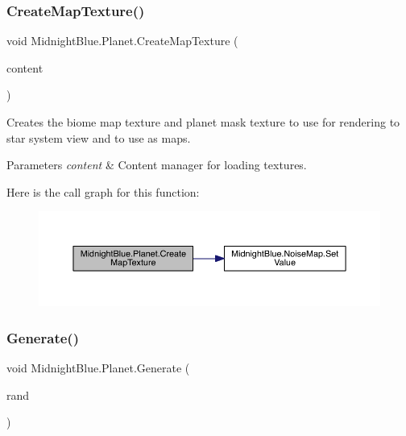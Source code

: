 \subsubsection{\texorpdfstring{Create\+Map\+Texture()}{CreateMapTexture()}}
{\footnotesize\ttfamily void Midnight\+Blue.\+Planet.\+Create\+Map\+Texture (\begin{DoxyParamCaption}\item[{Content\+Manager}]{content }\end{DoxyParamCaption})\hspace{0.3cm}{\ttfamily [inline]}}



Creates the biome map texture and planet mask texture to use for rendering to star system view and to use as maps. 


\begin{DoxyParams}{Parameters}
{\em content} & Content manager for loading textures.\\
\hline
\end{DoxyParams}
Here is the call graph for this function\+:\nopagebreak
\begin{figure}[H]
\begin{center}
\leavevmode
\includegraphics[width=350pt]{class_midnight_blue_1_1_planet_ae39b013905369f01902b4f28d4fc031e_cgraph}
\end{center}
\end{figure}
\hypertarget{class_midnight_blue_1_1_planet_ac7264aea3a992afb4cab0ad99c96dbb8}{}\label{class_midnight_blue_1_1_planet_ac7264aea3a992afb4cab0ad99c96dbb8} 
\subsubsection{\texorpdfstring{Generate()}{Generate()}}
{\footnotesize\ttfamily void Midnight\+Blue.\+Planet.\+Generate (\begin{DoxyParamCaption}\item[{Random}]{rand }\end{DoxyParamCaption})\hspace{0.3cm}{\ttfamily [inline]}}



